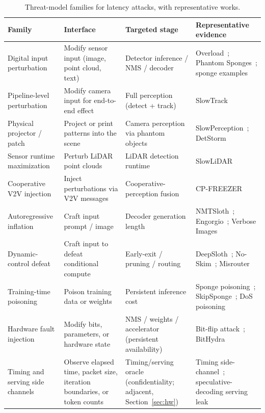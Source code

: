 \documentclass[acmsmall,screen,review,nonacm]{acmart}
\begin{document}
\begin{table}[htbp]
  \caption{Threat-model families for latency attacks, with representative works.}
  \label{tab:threats}
  \small
  \begin{tabularx}{\linewidth}{L{2.4cm} L{2.6cm} L{3.0cm} X}
    \toprule
    \textbf{Family} & \textbf{Interface} & \textbf{Targeted stage} & \textbf{Representative evidence} \\
    \midrule
    Digital input perturbation & Modify sensor input (image, point cloud, text) & Detector inference / NMS / decoder & Overload~\cite{chen2024overload}; Phantom Sponges~\cite{shapira2023phantom}; sponge examples~\cite{shumailov2021sponge} \\
    \addlinespace
    Pipeline-level perturbation & Modify camera input for end-to-end effect & Full perception (detect + track) & SlowTrack~\cite{ma2024slowtrack} \\
    \addlinespace
    Physical projector / patch & Project or print patterns into the scene & Camera perception via phantom objects & SlowPerception~\cite{ma2024slowperception}; DetStorm~\cite{muller2025detstorm} \\
    \addlinespace
    Sensor runtime maximization & Perturb LiDAR point clouds & LiDAR detection runtime & SlowLiDAR~\cite{liu2023slowlidar} \\
    \addlinespace
    Cooperative V2V injection & Inject perturbations via V2V messages & Cooperative-perception fusion & CP-FREEZER~\cite{wang2026cpfreezer} \\
    \addlinespace
    Autoregressive inflation & Craft input prompt / image & Decoder generation length & NMTSloth~\cite{chen2022nmtsloth}; Engorgio~\cite{dong2024engorgio}; Verbose Images~\cite{gao2024verbose} \\
    \addlinespace
    Dynamic-control defeat & Craft input to defeat conditional compute & Early-exit / pruning / routing & DeepSloth~\cite{hong2021deepsloth}; No-Skim~\cite{zhang2023noskim}; Misrouter~\cite{fei2026misrouter} \\
    \addlinespace
    Training-time poisoning & Poison training data or weights & Persistent inference cost & Sponge poisoning~\cite{cina2022sponge}; SkipSponge~\cite{telintelo2024skipsponge}; DoS poisoning~\cite{gao2024dospoisoning} \\
    \addlinespace
    Hardware fault injection & Modify bits, parameters, or hardware state & NMS / weights / accelerator (persistent availability) & Bit-flip attack~\cite{sistla2025bitflip}; BitHydra~\cite{yan2025bithydra} \\
    \addlinespace
    Timing and serving side channels & Observe elapsed time, packet size, iteration boundaries, or token counts & Timing/serving oracle (confidentiality; adjacent, Section~\ref{sec:hw}) & Timing side-channel~\cite{nakai2021timing}; speculative-decoding serving leak~\cite{sun2024speculative} \\
    \bottomrule
  \end{tabularx}
\end{table}
\end{document}
